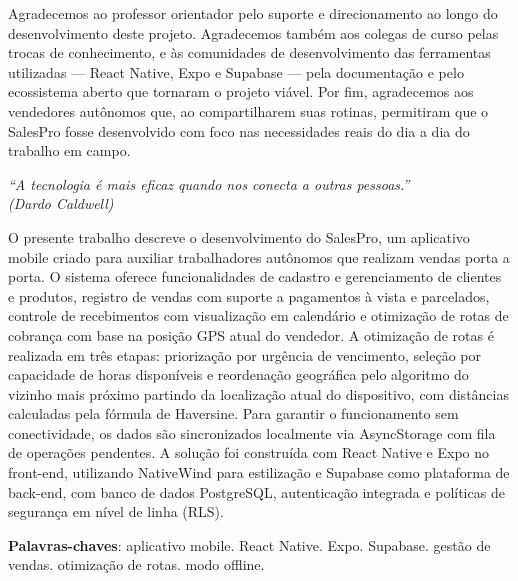 \documentclass[
	12pt,				%
	oneside,			%
	a4paper,			%
	english,			%
	brazil				%
	]{abntex2}
\begin{document}
\begin{agradecimentos}
Agradecemos ao professor orientador pelo suporte e direcionamento ao longo do desenvolvimento deste projeto. Agradecemos também aos colegas de curso pelas trocas de conhecimento, e às comunidades de desenvolvimento das ferramentas utilizadas — React Native, Expo e Supabase — pela documentação e pelo ecossistema aberto que tornaram o projeto viável. Por fim, agradecemos aos vendedores autônomos que, ao compartilharem suas rotinas, permitiram que o SalesPro fosse desenvolvido com foco nas necessidades reais do dia a dia do trabalho em campo.
\end{agradecimentos}

\begin{epigrafe}
    \vspace*{\fill}
	\begin{flushright}
		\textit{``A tecnologia é mais eficaz quando nos conecta a outras pessoas.''\\
		(Dardo Caldwell)}
	\end{flushright}
\end{epigrafe}


\setlength{\absparsep}{18pt}
\begin{resumo}
O presente trabalho descreve o desenvolvimento do SalesPro, um aplicativo mobile criado para auxiliar trabalhadores autônomos que realizam vendas porta a porta. O sistema oferece funcionalidades de cadastro e gerenciamento de clientes e produtos, registro de vendas com suporte a pagamentos à vista e parcelados, controle de recebimentos com visualização em calendário e otimização de rotas de cobrança com base na posição GPS atual do vendedor. A otimização de rotas é realizada em três etapas: priorização por urgência de vencimento, seleção por capacidade de horas disponíveis e reordenação geográfica pelo algoritmo do vizinho mais próximo partindo da localização atual do dispositivo, com distâncias calculadas pela fórmula de Haversine. Para garantir o funcionamento sem conectividade, os dados são sincronizados localmente via AsyncStorage com fila de operações pendentes. A solução foi construída com React Native e Expo no front-end, utilizando NativeWind para estilização e Supabase como plataforma de back-end, com banco de dados PostgreSQL, autenticação integrada e políticas de segurança em nível de linha (RLS).

 \textbf{Palavras-chaves}: aplicativo mobile. React Native. Expo. Supabase. gestão de vendas. otimização de rotas. modo offline.
\end{resumo}
\end{document}
